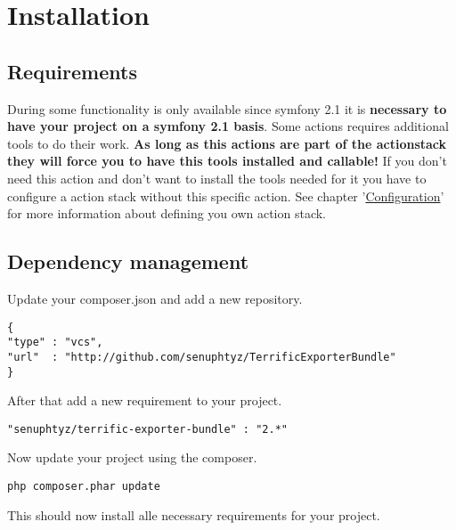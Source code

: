 
\section{Installation}


\subsection{Requirements}
During some functionality is only available since symfony 2.1 it is \textbf{necessary to have your project on a symfony 2.1 basis}. Some actions requires additional tools to do their work. \textbf{As long as this actions are part of the actionstack they will force you to have this tools installed and callable!} If you don't need this action and don't want to install the tools needed for it you have to configure a action stack without this specific action. See chapter '\mbox{\hyperlink{chap-Configuration}{Configuration}}' for more information about defining you own action stack.

\subsection{Dependency management}
Update your composer.json and add a new repository. \\

\begin{verbatim}
{
"type" : "vcs",
"url"  : "http://github.com/senuphtyz/TerrificExporterBundle"
}
\end{verbatim}

\noindent After that add a new requirement to your project. \\

\begin{verbatim}
"senuphtyz/terrific-exporter-bundle" : "2.*"
\end{verbatim}
\noindent Now update your project using the composer. \\

\begin{verbatim}
php composer.phar update
\end{verbatim}
\noindent This should now install alle necessary requirements for your project. \\

